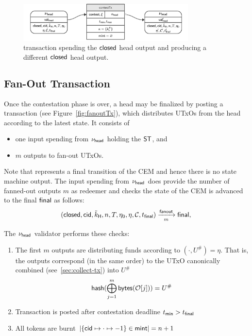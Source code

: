 \begin{figure}[h]
	\centering \includegraphics[width=0.8\textwidth]{figures/contestTx.pdf}
	\caption{\mtxContest{} transaction spending the $\mathsf{closed}$ head output and producing a different $\mathsf{closed}$ head output.}\label{fig:contestTx}
\end{figure}

\subsection{Fan-Out Transaction}

\begin{samepage}
	Once the contestation phase is over, a head may be finalized by posting a
	\mtxFanout{} transaction (see Figure~\ref{fig:fanoutTx}), which
	distributes UTxOs from the head according to the latest state. It consists of
	\begin{itemize}
		\item one input spending from $\nu_\mathsf{head}$ holding the $\mathsf{ST}$, and
		\item $m$ outputs to fan-out UTxOs.
	\end{itemize}
	Note that \mtxFanout{} represents a final transition of the CEM and hence there
	is no state machine output. The input spending from $\nu_\mathsf{head}$ does provide the
	number of fanned-out outputs $m$ as redeemer and checks the state of the CEM is
	advanced to the final $\mathsf{final}$ as follows:
	\[
		(\mathsf{closed},\mathsf{cid},\tilde{k}_{\mathsf{H}},n,T,\eta_0,\eta,\mathcal{C},t_{\mathsf{final}}) \xrightarrow[m]{\mathsf{fanout}} \mathsf{final},
	\]
\end{samepage}

\noindent The $\nu_\mathsf{head}$ validator performs these checks:
\begin{enumerate}
	\item The first $m$ outputs are distributing funds according to
	      $(\cdot, U^{\#}) = \eta$. That is, the outputs correspond (in the same
	      order) to the UTxO canonically combined (see~\ref{sec:collect-tx}) into
	      $U^{\#}$
	      \[
		      \mathsf{hash}(\bigoplus_{j=1}^{m} \mathsf{bytes}(\mathcal{O}[j])) = U^{\#}
	      \]
	\item Transaction is posted after contestation deadline $t_{\mathsf{min}} > t_{\mathsf{final}}$
	\item All tokens are burnt
	      $|\{\mathsf{cid} \mapsto \cdot \mapsto -1\} \in \mathsf{mint}| = n + 1$
\end{enumerate}

